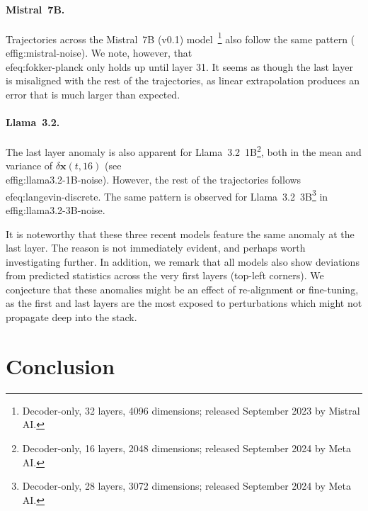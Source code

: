 \documentclass{article} %
\def\vx{{\bm{x}}}
\begin{document}
\paragraph{Mistral~7B.}
Trajectories across the  Mistral~7B (v0.1) model~\citep{jiang2023mistral7b}\footnote{
Decoder-only, 32 layers, 4096 dimensions; released September 2023 by Mistral AI.
}
also follow the same pattern (\\ef{fig:mistral-noise}).
We note, however, that \\ef{eq:fokker-planck} only holds up until layer 31. 
It seems as though the last layer is misaligned with the rest of the trajectories, as linear extrapolation produces an error that is much larger than expected.

\paragraph{Llama~3.2.}
The last layer anomaly is also apparent for Llama~3.2~1B\footnote{
Decoder-only, 16 layers, 2048 dimensions; released September 2024 by Meta AI.
}, both in the mean and variance of $\delta\vx(t,16)$ (see \\ef{fig:llama3.2-1B-noise}).
However, the rest of the trajectories follows \\ef{eq:langevin-discrete}.
The same pattern is observed for Llama~3.2~3B\footnote{
Decoder-only, 28 layers, 3072 dimensions; released September 2024 by Meta AI.
} in \\ef{fig:llama3.2-3B-noise}.

It is noteworthy that these three recent models feature the same anomaly at the last layer.
The reason is not immediately evident, and perhaps worth investigating further.
In addition, we remark that all models also show deviations from predicted statistics across the very first layers (top-left corners). 
We conjecture that these anomalies might be an effect of re-alignment or fine-tuning, as the first and last layers are the most exposed to perturbations which might not propagate deep into the stack.

\section{Conclusion}



\end{document}
